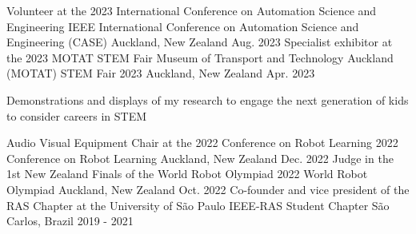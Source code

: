 \begin{cventries}





  \cventry
    {Volunteer at the 2023 International Conference on Automation Science and Engineering} %
    {IEEE International Conference on Automation Science and Engineering (CASE)} %
    {Auckland, New Zealand} %
    {Aug. 2023} %
    {}
\vspace{-13pt} 
  \cventry
    {Specialist exhibitor at the 2023 MOTAT STEM Fair} %
    {Museum of Transport and Technology Auckland (MOTAT) STEM Fair 2023} %
    {Auckland, New Zealand} %
    {Apr. 2023} %
    { \begin{cvitems} %
        \item {Demonstrations and displays of my research to engage the next generation of kids to consider careers in STEM}
      \end{cvitems}}
\vspace{-1pt} 
  \cventry
    {Audio Visual Equipment Chair at the 2022 Conference on Robot Learning} %
    {2022 Conference on Robot Learning} %
    {Auckland, New Zealand} %
    {Dec. 2022} %
    {}
\vspace{-13pt} 
  \cventry
    {Judge in the 1st New Zealand Finals of the World Robot Olympiad} %
    {2022 World Robot Olympiad} %
    {Auckland, New Zealand} %
    {Oct. 2022} %
    {}
\vspace{-13pt} 
  \cventry
    {Co-founder and vice president of the RAS Chapter at the University of São Paulo} %
    {IEEE-RAS Student Chapter} %
    {São Carlos, Brazil} %
    {2019 - 2021} %
    {}
\vspace{-20pt} 


\end{cventries}
